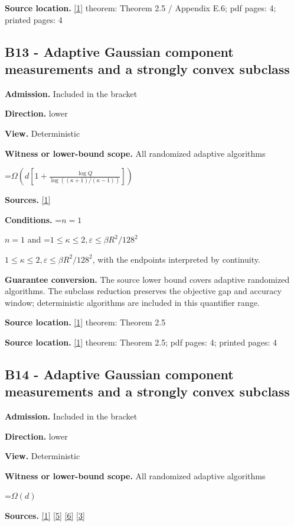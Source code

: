 \documentclass[10pt,a4paper]{article}
\newcommand{\AtlasMath}[1]{\par\begingroup\centering\setbox0=\hbox{$\displaystyle #1$}\ifdim\wd0>1.4\linewidth\typeout{ATLAS WIDE FORMULA: \the\wd0}\fi\ifdim\wd0>\linewidth\resizebox{\linewidth}{!}{\box0}\else\box0\fi\par\endgroup}
\newcommand{\AtlasInlineMath}[1]{\begingroup\setbox0=\hbox{$#1$}\ifdim\wd0>.4\linewidth\endgroup\AtlasMath{#1}\else\endgroup$#1$\fi}
\begin{document}
\textbf{Source location.} \href{https://arxiv.org/html/2610.00345v1}{[1]} theorem: Theorem 2.5 / Appendix E.6; pdf pages: 4; printed pages: 4

\subsection{B13 - Adaptive Gaussian component measurements and a strongly convex subclass}
\textbf{Admission.} Included in the bracket

\textbf{Direction.} lower

\textbf{View.} Deterministic

\textbf{Witness or lower-bound scope.} All randomized adaptive algorithms

\AtlasMath{\Omega\!\left(d\left[1+\frac{\log Q}{\log((\kappa+1)/(\kappa-1))}\right]\right)}
\textbf{Sources.} \href{https://arxiv.org/html/2610.00345v1}{[1]}

\textbf{Conditions.} \AtlasInlineMath{n=1} and \AtlasInlineMath{1\le\kappa\le2,\varepsilon\le \beta R^2/128^2}, with the endpoints interpreted by continuity.

\textbf{Guarantee conversion.} The source lower bound covers adaptive randomized algorithms. The subclass reduction preserves the objective gap and accuracy window; deterministic algorithms are included in this quantifier range.

\textbf{Source location.} \href{https://arxiv.org/html/2610.00345v1}{[1]} theorem: Theorem 2.5

\textbf{Source location.} \href{https://arxiv.org/html/2610.00345v1}{[1]} theorem: Theorem 2.5; pdf pages: 4; printed pages: 4

\subsection{B14 - Adaptive Gaussian component measurements and a strongly convex subclass}
\textbf{Admission.} Included in the bracket

\textbf{Direction.} lower

\textbf{View.} Deterministic

\textbf{Witness or lower-bound scope.} All randomized adaptive algorithms

\AtlasMath{\Omega(d)}
\textbf{Sources.} \href{https://arxiv.org/html/2610.00345v1}{[1]} \href{https://arxiv.org/html/2607.16558v2}{[5]} \href{https://www.mathnet.ru/php/archive.phtml?jrnid=mzm&option_lang=eng&paperid=1697&wshow=paper}{[6]} \href{https://arxiv.org/abs/2109.08858}{[3]}
\end{document}
